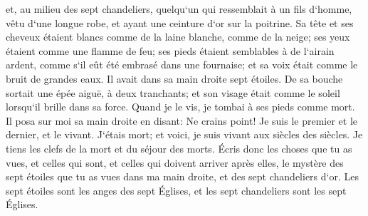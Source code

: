 \verse et, au milieu des sept chandeliers, quelqu`un qui ressemblait à un fils d`homme, vêtu d`une longue robe, et ayant une ceinture d`or sur la poitrine. 
\verse Sa tête et ses cheveux étaient blancs comme de la laine blanche, comme de la neige; ses yeux étaient comme une flamme de feu; 
\verse ses pieds étaient semblables à de l`airain ardent, comme s`il eût été embrasé dans une fournaise; et sa voix était comme le bruit de grandes eaux. 
\verse Il avait dans sa main droite sept étoiles. De sa bouche sortait une épée aiguë, à deux tranchants; et son visage était comme le soleil lorsqu`il brille dans sa force. 
\verse Quand je le vis, je tombai à ses pieds comme mort. Il posa sur moi sa main droite en disant: Ne crains point! 
\verse Je suis le premier et le dernier, et le vivant. J`étais mort; et voici, je suis vivant aux siècles des siècles. Je tiens les clefs de la mort et du séjour des morts. 
\verse Écris donc les choses que tu as vues, et celles qui sont, et celles qui doivent arriver après elles, 
\verse le mystère des sept étoiles que tu as vues dans ma main droite, et des sept chandeliers d`or. Les sept étoiles sont les anges des sept Églises, et les sept chandeliers sont les sept Églises. 

